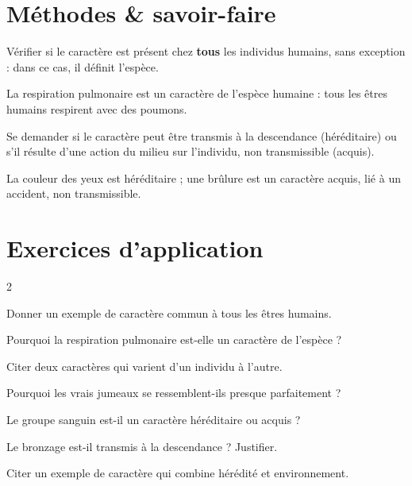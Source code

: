\section{Méthodes \& savoir-faire}

Vérifier si le caractère est présent chez \textbf{tous} les individus humains, sans
exception : dans ce cas, il définit l'espèce.
\begin{exemple}
La respiration pulmonaire est un caractère de l'espèce humaine : tous les êtres
humains respirent avec des poumons.
\end{exemple}

Se demander si le caractère peut être transmis à la descendance (héréditaire) ou s'il
résulte d'une action du milieu sur l'individu, non transmissible (acquis).
\begin{exemple}
La couleur des yeux est héréditaire ; une brûlure est un caractère acquis, lié à un
accident, non transmissible.
\end{exemple}

\section{Exercices d'application}
\begin{multicols}{2}

\exo{} Donner un exemple de caractère commun à tous les êtres humains.

\exo{} Pourquoi la respiration pulmonaire est-elle un caractère de l'espèce ?

\exo{} Citer deux caractères qui varient d'un individu à l'autre.

\exo{} Pourquoi les vrais jumeaux se ressemblent-ils presque parfaitement ?

\exo{} Le groupe sanguin est-il un caractère héréditaire ou acquis ?

\exo{} Le bronzage est-il transmis à la descendance ? Justifier.

\exo{} Citer un exemple de caractère qui combine hérédité et environnement.

\end{multicols}

